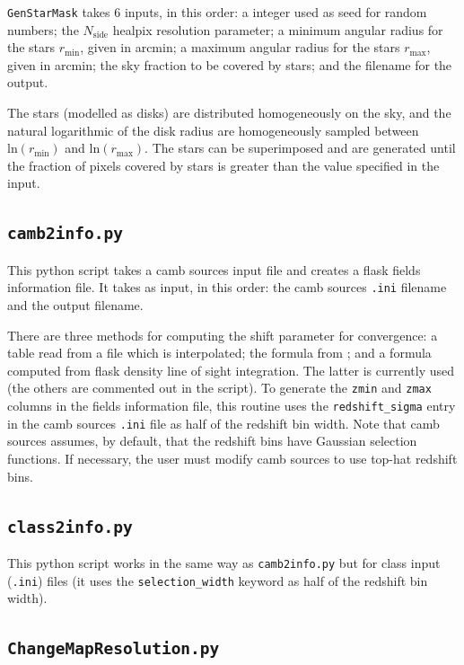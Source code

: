 \documentclass[12pt]{book} %
\newcommand{\nv}[1]{\mathrm{#1}}                 %
\begin{document}
{\tt GenStarMask} takes 6 inputs, in this order: a integer used as seed for random numbers; 
the $N_{\nv{side}}$ {\sc healpix} resolution parameter; a minimum angular radius for the stars $r_{\nv{min}}$, given 
in arcmin; a maximum angular radius for the stars $r_{\nv{max}}$, given in arcmin; the sky fraction to be covered 
by stars; and the filename for the output.

The stars (modelled as disks) are distributed homogeneously on the sky, and the natural 
logarithmic of the disk radius are homogeneously sampled between $\nv{ln}(r_{\nv{min}})$ and 
$\nv{ln}(r_{\nv{max}})$. The stars can be superimposed and are generated until the fraction of 
pixels covered by stars is greater than the value specified in the input.

\subsection{{\tt camb2info.py}}
\label{sec:camb2info}

This {\sc python} script takes a {\sc camb sources} input file and creates a 
{\sc flask} fields information file. It takes as input, in this order: 
the {\sc camb sources} {\tt .ini} filename and the output filename. 

There are three methods for computing the shift parameter for convergence:
a table read from a file which is interpolated; the formula from 
\citet{Hilbert11x}; and a formula computed from {\sc flask} 
density line of sight integration. The latter is currently used (the others 
are commented out in the script). To generate the {\tt zmin} and {\tt zmax} 
columns in the fields information file, this routine uses the {\tt redshift\_sigma} 
entry in the {\sc camb sources} {\tt .ini} file as half of the redshift bin width. 
Note that {\sc camb sources} assumes, by default, that the redshift bins have Gaussian selection 
functions. If necessary, the user must modify {\sc camb sources} to use 
top-hat redshift bins.

\subsection{{\tt class2info.py}}
\label{sec:class2info}

This {\sc python} script works in the same way as {\tt camb2info.py} but 
for {\sc class} input ({\tt .ini}) files (it uses the {\tt selection\_width} 
keyword as half of the redshift bin width).

\subsection{{\tt ChangeMapResolution.py}}
\label{sec:map-res}
\end{document}
